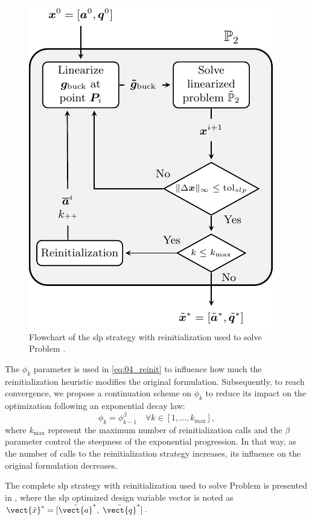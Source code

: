 \begin{figure}
    \centering
    \includegraphics[width=0.7\linewidth]{figures/04_TTO_improvements/06_SLP_algo/SLP_algo.pdf}
    \caption{Flowchart of the \gls{slp} strategy with reinitialization used to solve Problem .}
    \label{fig:04_slp_solution}
\end{figure}

The $\phi_k$ parameter is used in \eqref{eq:04_reinit} to influence how much the reinitialization heuristic modifies the original formulation. Subsequently, to reach convergence, we propose a continuation scheme on $\phi_k$ to reduce its impact on the optimization following an exponential decay law:
\begin{equation}
    \phi_k = \phi_{k-1}^\beta \quad \forall k \in [1,\dots,k_{\text{max}}],
    \label{eq:04_phi}
\end{equation}
where $k_{\text{max}}$ represent the maximum number of reinitialization calls and the $\beta$ parameter control the steepness of the exponential progression. In that way, as the number of calls to the reinitialization strategy increases, its influence on the original formulation decreases.

The complete \gls{slp} strategy with reinitialization used to solve Problem  is presented in , where the \gls{slp} optimized design variable vector is noted as $\vect{\tilde{x}}^*=[\tilde{\vect{a}}^*, \; \tilde{\vect{q}}^*]$.

